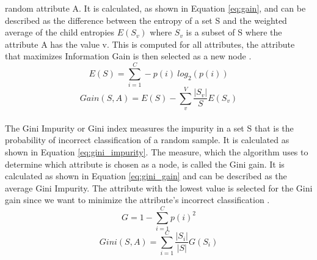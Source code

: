random attribute A.  It is calculated, as shown in Equation \ref{eq:gain}, and 
can be described as the difference between the entropy of a set S and the 
weighted average of the child entropies $E(S_v)$ where $S_v$ is a subset of S 
where the attribute A has the value v. This is computed for all 
attributes, the attribute that maximizes Information Gain is then selected as a 
new node \cite{RN165}.
\begin{equation}
 E(S) = \sum_{i=1}^C -p(i) \ log_2(p(i))
 \label{eq:entropy}
\end{equation}
\begin{equation}
 Gain(S, A) = E(S) - \sum_{v}^{V} \frac{|S_v|}{S} E(S_v)
 \label{eq:gain}
\end{equation}
\\
The Gini Impurity or Gini index measures the impurity in a set S that is the 
probability of incorrect classification of a random sample. It is calculated 
as shown in Equation \ref{eq:gini_impurity}. The measure, which the algorithm 
uses to determine which attribute is chosen as a node, is called the Gini gain. 
It is calculated as shown in Equation \ref{eq:gini_gain} and can be 
described as the average Gini Impurity. The attribute with the lowest value is 
selected for the Gini gain since we want to minimize the attribute's incorrect 
classification \cite{RN171}.
\begin{equation}
 G = 1 - \sum_{i=1}^C p(i)^2
 \label{eq:gini_impurity}
\end{equation}
\begin{equation}
 Gini(S, A) = \sum_{i=1}^C \frac{|S_i|}{|S|} G(S_i)
 \label{eq:gini_gain}
\end{equation}
\\
